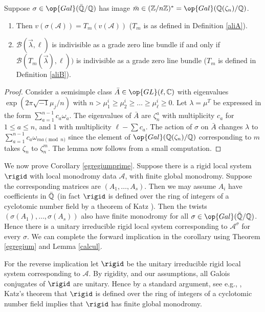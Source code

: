 \begin{lemma}
\notready\label{calcul}
Suppose $\sigma\in \op{Gal}(\bar{\Bbb{Q}}/\Bbb{Q})$ has image $\bar{m}\in (\Bbb{Z}/n\Bbb{Z})^*=\op{Gal}(\Bbb{Q}(\zeta_n)/\Bbb{Q})$.

\begin{enumerate}
\item Then $v(\sigma(\mathcal{A}))= T_m(v(\mathcal{A}))$ ($T_m$ is as defined in Definition  \ref{aliA}).
\item  $\mathcal{B}(\vec{\lambda},\ell)$ is indivisible as a grade zero line bundle if and only if
$\mathcal{B}(T_m(\vec{\lambda}),\ell))$ is indivisible as a grade zero line bundle ($T_m$ is  defined in Definition  \ref{aliB}).
\end{enumerate}
\end{lemma}
\begin{proof}
Consider a  semisimple class $\bar{A}\in \op{GL}(\ell,\Bbb{C})$ with eigenvalues $\exp(2\pi\sqrt{-1}\mu_j/n)$ with $n>\mu^i_1\geq \mu^i_2\geq \dots \geq \mu^i_{\ell}\geq 0$. Let $\lambda=\mu^T$ be expressed in the form $\sum_{a=1}^{n-1} c_a\omega_a$. The eigenvalues of $\bar{A}$ are $\zeta_n^a$ with multiplicity  $c_a$  for $1\leq a \leq n$, and $1$ with multiplicity $\ell-\sum c_a$. The action of $\sigma$ on $\bar{A}$ changes $\lambda$ to $\sum_{a=1}^{n-1} c_a\omega_{ma \pmod n}$ since the element of $\op{Gal}(\Bbb{Q}(\zeta_n)/\Bbb{Q})$ corresponding to $m$ takes $\zeta_n$ to $\zeta_n^m$.
The lemma now follows from a small computation.
\end{proof}
We now prove Corollary \ref{egregiumprime}. Suppose there is a rigid local system $\rigid$  with local monodromy data $\mathcal{A}$, with finite global monodromy. Suppose the corresponding matrices are $(A_1,\dots,A_s)$. Then we may assume
$A_i$ have coefficients in $\bar{\Bbb{Q}}$ (in fact $\rigid$ is defined over the ring of integers of a cyclotomic
number field by a theorem of Katz \cite{Katz}). Then the twists $(\sigma(A_1),\dots,\sigma(A_s))$ also have finite monodromy for all $\sigma\in \op{Gal}(\bar{\Bbb{Q}}/\Bbb{Q})$. Hence there is a unitary irreducible rigid local system corresponding to $\mathcal{A}^{\sigma}$ for every $\sigma$. We can complete the forward implication in the corollary using Theorem \ref{egregium} and Lemma \ref{calcul}.

For the reverse implication let $\rigid$ be the unitary irreducible rigid local system corresponding to $\mathcal{A}$. By rigidity, and our assumptions,  all Galois conjugates of $\rigid$ are unitary. Hence by a standard argument, see e.g., \cite[Theorem 11]{BLocal}, Katz's theorem that $\rigid$ is
defined over the ring of integers of a cyclotomic number field implies that $\rigid$ has finite global monodromy.
